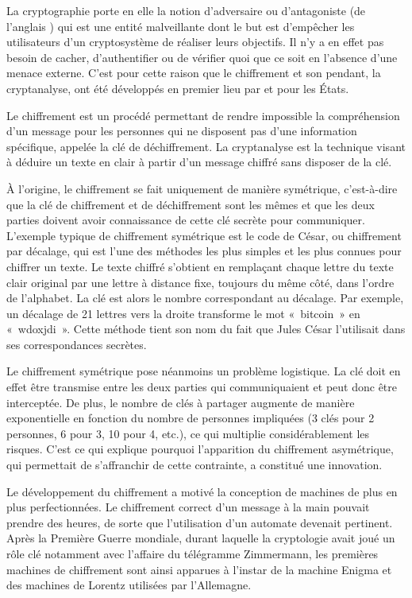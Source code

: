 La cryptographie porte en elle la notion d'adversaire ou d'antagoniste (de l'anglais ) qui est une entité malveillante dont le but est d'empêcher les utilisateurs d'un cryptosystème de réaliser leurs objectifs. Il n'y a en effet pas besoin de cacher, d'authentifier ou de vérifier quoi que ce soit en l'absence d'une menace externe. C'est pour cette raison que le chiffrement et son pendant, la cryptanalyse, ont été développés en premier lieu par et pour les États. %

Le chiffrement est un procédé permettant de rendre impossible la compréhension d'un message pour les personnes qui ne disposent pas d'une information spécifique, appelée la clé de déchiffrement. La cryptanalyse est la technique visant à déduire un texte en clair à partir d'un message chiffré sans disposer de la clé.

À l'origine, le chiffrement se fait uniquement de manière symétrique, c'est-à-dire que la clé de chiffrement et de déchiffrement sont les mêmes et que les deux parties doivent avoir connaissance de cette clé secrète pour communiquer. L'exemple typique de chiffrement symétrique est le code de César, ou chiffrement par décalage, qui est l'une des méthodes les plus simples et les plus connues pour chiffrer un texte. Le texte chiffré s'obtient en remplaçant chaque lettre du texte clair original par une lettre à distance fixe, toujours du même côté, dans l'ordre de l'alphabet. La clé est alors le nombre correspondant au décalage. Par exemple, un décalage de 21 lettres vers la droite transforme le mot «~bitcoin~» en «~wdoxjdi~». Cette méthode tient son nom du fait que Jules César l'utilisait dans ses correspondances secrètes.

Le chiffrement symétrique pose néanmoins un problème logistique. La clé doit en effet être transmise entre les deux parties qui communiquaient et peut donc être interceptée. De plus, le nombre de clés à partager augmente de manière exponentielle en fonction du nombre de personnes impliquées (3 clés pour 2 personnes, 6 pour 3, 10 pour 4, etc.), ce qui multiplie considérablement les risques. C'est ce qui explique pourquoi l'apparition du chiffrement asymétrique, qui permettait de s'affranchir de cette contrainte, a constitué une innovation.

Le développement du chiffrement a motivé la conception de machines de plus en plus perfectionnées. Le chiffrement correct d'un message à la main pouvait prendre des heures, de sorte que l'utilisation d'un automate devenait pertinent. Après la Première Guerre mondiale, durant laquelle la cryptologie avait joué un rôle clé notamment avec l'affaire du télégramme Zimmermann, les premières machines de chiffrement sont ainsi apparues à l'instar de la machine Enigma et des machines de Lorentz utilisées par l'Allemagne.


